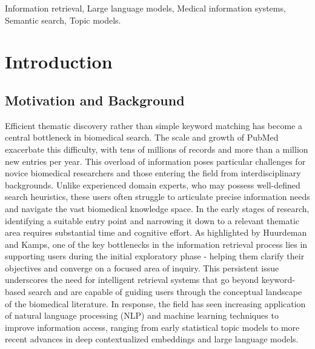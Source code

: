 \documentclass{ieeeaccess}
\begin{document}
\begin{keywords}
Information retrieval, Large language models, Medical information systems, Semantic search, Topic models.
\end{keywords}

\titlepgskip=-21pt

\maketitle

\section{Introduction}
\label{sec:introduction}
\subsection{Motivation and Background}
Efficient thematic discovery rather than simple keyword matching has become a central bottleneck in biomedical search. The scale and growth of PubMed exacerbate this difficulty, with tens of millions of records and more than a million new entries per year\cite{jin_pubmed_2024}.
This overload of information poses particular challenges for novice biomedical researchers and those entering the field from interdisciplinary backgrounds. Unlike experienced domain experts, who may possess well-defined search heuristics, these users often struggle to articulate precise information needs and navigate the vast biomedical knowledge space. In the early stages of research, identifying a suitable entry point and narrowing it down to a relevant thematic area requires substantial time and cognitive effort. As highlighted by Huurdeman and Kamps\cite{fu_designing_2020}, one of the key bottlenecks in the information retrieval process lies in supporting users during the initial exploratory phase - helping them clarify their objectives and converge on a focused area of inquiry. This persistent issue underscores the need for intelligent retrieval systems that go beyond keyword-based search and are capable of guiding users through the conceptual landscape of the biomedical literature. In response, the field has seen increasing application of natural language processing (NLP) and machine learning techniques to improve information access, ranging from early statistical topic models to more recent advances in deep contextualized embeddings and large language models.
\end{document}

